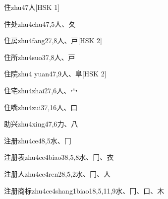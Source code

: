 \begin{entry}{住}{zhu4}{7}{⼈}[HSK 1]
\end{entry}

\begin{entry}{住处}{zhu4chu4}{7,5}{⼈、⼡}
\end{entry}

\begin{entry}{住房}{zhu4fang2}{7,8}{⼈、⼾}[HSK 2]
\end{entry}

\begin{entry}{住所}{zhu4suo3}{7,8}{⼈、⼾}
\end{entry}

\begin{entry}{住院}{zhu4 yuan4}{7,9}{⼈、⾩}[HSK 2]
\end{entry}

\begin{entry}{住宅}{zhu4zhai2}{7,6}{⼈、⼧}
\end{entry}

\begin{entry}{住嘴}{zhu4zui3}{7,16}{⼈、⼝}
\end{entry}

\begin{entry}{助兴}{zhu4xing4}{7,6}{⼒、⼋}
\end{entry}

\begin{entry}{注册}{zhu4ce4}{8,5}{⽔、⼌}
\end{entry}

\begin{entry}{注册表}{zhu4ce4biao3}{8,5,8}{⽔、⼌、⾐}
\end{entry}

\begin{entry}{注册人}{zhu4ce4ren2}{8,5,2}{⽔、⼌、⼈}
\end{entry}

\begin{entry}{注册商标}{zhu4ce4shang1biao1}{8,5,11,9}{⽔、⼌、⼝、⽊}
\end{entry}

